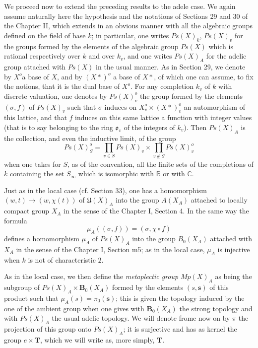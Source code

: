 \documentclass[12pt]{amsart}
\newcounter{ssection}
\renewcommand{\subsection}{
  \addtocounter{ssection}{1}{\bf  \arabic{ssection}.\  }}
\begin{document}
\subsection{}
We proceed now to extend the preceding results to the adele case.
We again assume naturally here the hypothesis and the notations of
Sections 29 and 30 of the Chapter II, which extends in an obvious
manner with all the algebraic groups defined on the field of base
$k$; in particular, one writes $Ps(X)_{k}$, $Ps(X)_{v}$ for the
groups formed by the elements of the algebraic group $Ps(X)$ which
is rational respectively over $k$ and over $k_{v}$, and one writes
$Ps(X)_{A}$ for the adelic group attached with $Ps(X)$ in the usual
manner. As in Section 29, we denote by $X^{o}$a base of $X$, and
by $(X*)^{o}$ a base of $X*$, of which one can assume, to fix the
notions, that it is the dual base of $X^{o}$. For any completion
$k_{v}$ of $k$ with discrete valuation, one denotes by $Ps(X)_{v}^{o}$
the group formed by the elements $(\sigma,f)$ of $Ps(X)_{v}$ such
that $\sigma$ induces on $X_{v}^{o}\times(X*)_{v}^{o}$ an automorphism
of this lattice, and that $f$ induces on this same lattice a function
with integer values (that is to say belonging to the ring $\mathfrak{o}_{v}$
of the integers of $k_{v}$). Then $Ps(X)_{A}$ is the collection,
and even the inductive limit, of the group\[
Ps(X)_{S}^{o}=\prod_{v\in S}Ps(X)_{v}\times\prod_{v\notin S}Ps(X)_{v}^{o}\]
when one takes for $S$, as of the convention, all the finite sets
of the completions of $k$ containing the set $S_{\infty}$ which
is isomorphic with $\mathbb{R}$ or with $\mathbb{C}$.

Just as in the local case (cf. Section 33), one has a homomorphism
$(w,t)\to(w,\chi(t))$ of $\mathfrak{U}(X)_{A}$ into the group $A(X_{A})$
attached to locally compact group $X_{A}$ in the sense of the Chapter
I, Section 4. In the same way the formula\[
\mu_{A}((\sigma,f))=(\sigma,\chi\circ f)\]
defines a homomorphism $\mu_{A}$ of $Ps(X)_{A}$ into the group $B_{0}(X_{A})$
attached with $X_{A}$ in the sense of the Chapter I, Section m5;
as in the local case, $\mu_{A}$ is injective when $k$ is not of
characteristic $2$.

As in the local case, we then define the \emph{metaplectic group}
$Mp(X)_{A}$ as being the subgroup of $Ps(X)_{A}\times\mathbf{B}_{0}(X_{A})$
formed by the elements $(s,\mathbf{s})$ of this product such that
$\mu_{A}(s)=\pi_{0}(\mathbf{s})$; this is given the topology induced
by the one of the ambient group when one gives with $\mathbf{B}_{0}(X_{A})$
the strong topology and with $Ps(X)_{A}$ the usual adelic topology.
We will denote frome now on by $\pi$ the projection of this group
onto $Ps(X)_{A}$; it is surjective and has as kernel the group ${e}\times\mathbf{T}$,
which we will write as, more simply, $\mathbf{T}$.
\end{document}
